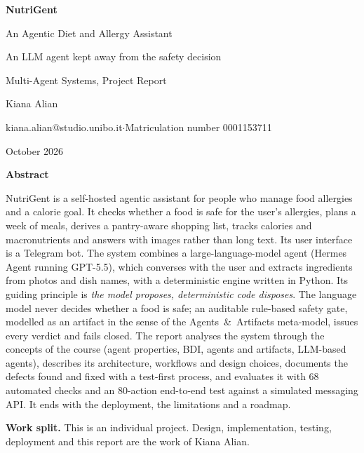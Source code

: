 \documentclass[11pt,a4paper]{article}
\makeatletter
\newcommand{\studentname}{Kiana Alian}
\newcommand{\studentemail}{kiana.alian@studio.unibo.it}
\newcommand{\studentid}{0001153711}
\makeatother
\begin{document}
\begin{titlepage}
\centering
\vspace*{2cm}
{\Huge\bfseries NutriGent\par}
\vspace{0.4cm}
{\LARGE An Agentic Diet and Allergy Assistant\par}
\vspace{0.6cm}
{\large An LLM agent kept away from the safety decision\par}
\vspace{0.4cm}
{\large Multi-Agent Systems, Project Report\par}
\vspace{1.4cm}
{\large \studentname\par}
\vspace{2pt}
{\normalsize \studentemail \quad$\cdot$\quad Matriculation number \studentid\par}
\vspace{2pt}
{\normalsize October 2026\par}
\vspace{1.6cm}

\begin{minipage}{0.86\textwidth}
\small
\begin{center}\textbf{Abstract}\end{center}
NutriGent is a self-hosted agentic assistant for people who manage food allergies and a calorie goal.
It checks whether a food is safe for the user's allergies, plans a week of meals, derives a
pantry-aware shopping list, tracks calories and macronutrients and answers with images rather than
long text. Its user interface is a Telegram bot. The system combines a large-language-model agent
(Hermes Agent running GPT-5.5), which converses with the user and extracts ingredients from photos and
dish names, with a deterministic engine written in Python. Its guiding principle is \emph{the model
proposes, deterministic code disposes}. The language model never decides whether a food is safe; an
auditable rule-based safety gate, modelled as an artifact in the sense of the Agents~\&~Artifacts
meta-model, issues every verdict and fails closed. The report analyses the system through the concepts
of the course (agent properties, BDI, agents and artifacts, LLM-based agents), describes its
architecture, workflows and design choices, documents the defects found and fixed with a test-first
process, and evaluates it with 68 automated checks and an 80-action end-to-end test against a
simulated messaging API. It ends with the deployment, the limitations and a roadmap.
\end{minipage}

\vfill
{\small \textbf{Work split.} This is an individual project. Design, implementation, testing,
deployment and this report are the work of \studentname.\par}
\end{titlepage}
\end{document}
